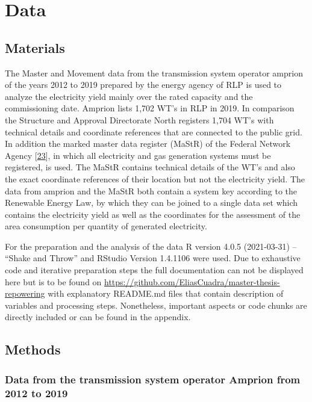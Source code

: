 \documentclass[a4paper,11pt]{article}
\begin{document}
\hypertarget{data}{%
\section{Data}\label{data}}

\hypertarget{materials}{%
\subsection{Materials}\label{materials}}

The Master and Movement data from the transmission system operator amprion of the years 2012 to 2019 prepared by the energy agency of RLP is used to analyze the electricity yield mainly over the rated capacity and the commissioning date. Amprion lists 1,702 WT's in RLP in 2019. In comparison the Structure and Approval Directorate North registers 1,704 WT's with technical details and coordinate references that are connected to the public grid. In addition the marked master data register (MaStR) of the Federal Network Agency {[}\protect\hyperlink{ref-Marktstammdatenregister.2020}{23}{]}, in which all electricity and gas generation systems must be registered, is used. The MaStR contains technical details of the WT's and also the exact coordinate references of their location but not the electricity yield. The data from amprion and the MaStR both contain a system key according to the Renewable Energy Law, by which they can be joined to a single data set which contains the electricity yield as well as the coordinates for the assessment of the area consumption per quantity of generated electricity.

For the preparation and the analysis of the data R version 4.0.5 (2021-03-31) -- ``Shake and Throw'' and RStudio Version 1.4.1106 were used. Due to exhaustive code and iterative preparation steps the full documentation can not be displayed here but is to be found on \url{https://github.com/EliasCuadra/master-thesis-repowering} with explanatory README.md files that contain description of variables and processing steps. Nonetheless, important aspects or code chunks are directly included or can be found in the appendix.

\hypertarget{methods}{%
\subsection{Methods}\label{methods}}

\hypertarget{data-from-the-transmission-system-operator-amprion-from-2012-to-2019}{%
\subsubsection{Data from the transmission system operator Amprion from 2012 to 2019}\label{data-from-the-transmission-system-operator-amprion-from-2012-to-2019}}
\end{document}
